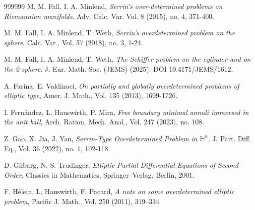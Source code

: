 \documentclass[11pt]{article}
\numberwithin{equation} {section}
\begin{document}
\begin{thebibliography}{999999}
	 M. M. Fall, I. A. Minlend,  \emph{Serrin’s over-determined problems on Riemannian manifolds}. Adv. Calc. Var. Vol. 8 (2015), no. 4, 371-400.
	
	 M. M. Fall, I. A. Minlend, T. Weth, {\it Serrin's overdetermined problem on the sphere}. Calc. Var., Vol. 57 (2018), no. 3, 1-24.
	
		 M. M. Fall, I. A. Minlend, T. Weth, {\it The Schiffer problem on the cylinder and on the 2-sphere}. J. Eur. Math. Soc. (JEMS) (2025). DOI 10.4171/JEMS/1612.
			
	
	
	 A. Farina, E. Valdinoci, {\it On partially and globally overdetermined problems of elliptic type}, Amer. J. Math., Vol. 135 (2013), 1699-1726.
	
	 I. Fernández, L. Hauswirth, P. Mira, \emph{Free boundary minimal annuli immersed in the unit ball}, Arch. Ration. Mech. Anal., Vol. 247 (2023), no. 108.
	
	
	 Z. Gao, X. Jia, J. Yan, \emph{Serrin-Type Overdetermined Problem in $\mathbb{H}^n$}, J. Part. Diff. Eq., Vol. 36 (2022), no. 1, 102-118.
	
	
	
	 D. Gilbarg, N. S. Trudinger, \emph{Elliptic Partial Differential Equations of Second Order}, Classics in Mathematics, Springer--Verlag, Berlin, 2001.
	
	 F. H\'elein, L. Hauswirth, F. Pacard, \emph{A note on some overdetermined elliptic problem}, Pacific J. Math., Vol. 250 (2011), 319–334
	

\end{thebibliography}
\end{document}
